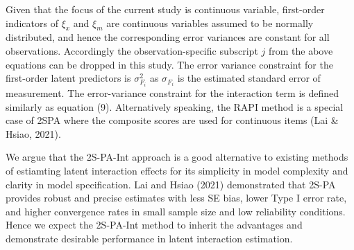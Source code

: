 \documentclass[
  man]{apa7}
\begin{document}
Given that the focus of the current study is continuous variable, first-order indicators of \(\xi_{x}\) and \(\xi_{m}\) are continuous variables assumed to be normally distributed, and hence the corresponding error variances are constant for all observations. Accordingly the observation-specific subscript \(j\) from the above equations can be dropped in this study. The error variance constraint for the first-order latent predictors is \(\sigma_{F_{i}}^2\) as \(\sigma_{F_{i}}\) is the estimated standard error of measurement. The error-variance constraint for the interaction term is defined similarly as equation (9). Alternatively speaking, the RAPI method is a special case of 2SPA where the composite scores are used for continuous items (Lai \& Hsiao, 2021).

We argue that the 2S-PA-Int approach is a good alternative to existing methods of estiamting latent interaction effects for its simplicity in model complexity and clarity in model specification. Lai and Hsiao (2021) demonstrated that 2S-PA provides robust and precise estimates with less SE bias, lower Type I error rate, and higher convergence rates in small sample size and low reliability conditions. Hence we expect the 2S-PA-Int method to inherit the advantages and demonstrate desirable performance in latent interaction estimation.
\end{document}
